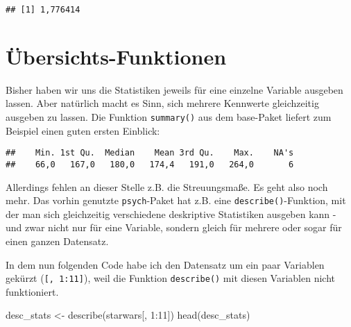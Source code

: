 \documentclass[
]{book}
\newenvironment{Shaded}{\begin{snugshade}}{\end{snugshade}}
\newcommand{\DecValTok}[1]{\textcolor[rgb]{0.00,0.00,0.81}{#1}}
\newcommand{\FunctionTok}[1]{\textcolor[rgb]{0.00,0.00,0.00}{#1}}
\newcommand{\NormalTok}[1]{#1}
\newcommand{\OtherTok}[1]{\textcolor[rgb]{0.56,0.35,0.01}{#1}}
\newcommand{\SpecialCharTok}[1]{\textcolor[rgb]{0.00,0.00,0.00}{#1}}
\begin{document}
\begin{verbatim}
## [1] 1,776414
\end{verbatim}

\hypertarget{uxfcbersichts-funktionen}{%
\section{Übersichts-Funktionen}\label{uxfcbersichts-funktionen}}

Bisher haben wir uns die Statistiken jeweils für eine einzelne Variable ausgeben lassen. Aber natürlich macht es Sinn, sich mehrere Kennwerte gleichzeitig ausgeben zu lassen. Die Funktion \texttt{summary()} aus dem base-Paket liefert zum Beispiel einen guten ersten Einblick:

\begin{Shaded}
\end{Shaded}

\begin{verbatim}
##    Min. 1st Qu.  Median    Mean 3rd Qu.    Max.    NA's 
##    66,0   167,0   180,0   174,4   191,0   264,0       6
\end{verbatim}

Allerdings fehlen an dieser Stelle z.B. die Streuungsmaße. Es geht also noch mehr. Das vorhin genutzte \texttt{psych}-Paket hat z.B. eine \texttt{describe()}-Funktion, mit der man sich gleichzeitig verschiedene deskriptive Statistiken ausgeben kann - und zwar nicht nur für eine Variable, sondern gleich für mehrere oder sogar für einen ganzen Datensatz.

In dem nun folgenden Code habe ich den Datensatz um ein paar Variablen gekürzt (\texttt{{[},\ 1:11{]}}), weil die Funktion \texttt{describe()} mit diesen Variablen nicht funktioniert.

\begin{Shaded}
\begin{Highlighting}[]
\NormalTok{desc\_stats }\OtherTok{\textless{}{-}} \FunctionTok{describe}\NormalTok{(starwars[, }\DecValTok{1}\SpecialCharTok{:}\DecValTok{11}\NormalTok{])}
\FunctionTok{head}\NormalTok{(desc\_stats)}
\end{Highlighting}
\end{Shaded}
\end{document}
